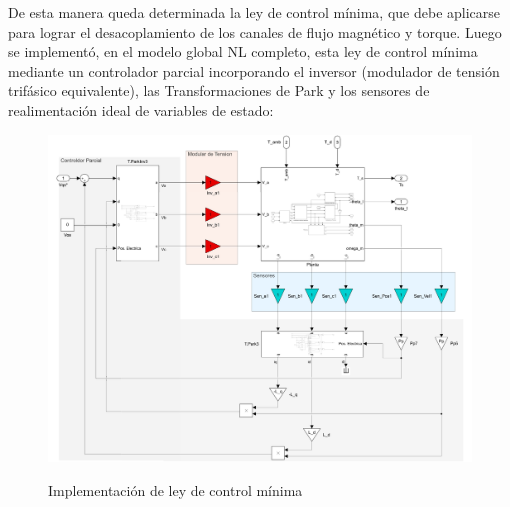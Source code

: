 \documentclass[a4paper, 10pt, onecolumn,journal]{ieeeconf}
\begin{document}
De esta manera queda determinada la ley de control mínima, que debe aplicarse para lograr el desacoplamiento de los canales de flujo magnético y torque.
Luego se implementó, en el modelo global NL completo, esta  ley de control mínima mediante un controlador parcial incorporando el inversor (modulador de tensión trifásico equivalente), las Transformaciones de Park y los sensores de realimentación ideal de variables de estado:
\begin{figure}
	\includegraphics{13-Ley_de_control_complementaria}
	\caption{}
\end{figure}

\begin{figure}[thpb]
	\centering
	\begin{adjustbox}{max width=\columnwidth}
	\end{adjustbox}
	\caption{Implementación de ley de control mínima}
	\label{Implementación de ley de control mínima}
\end{figure}
\end{document}
